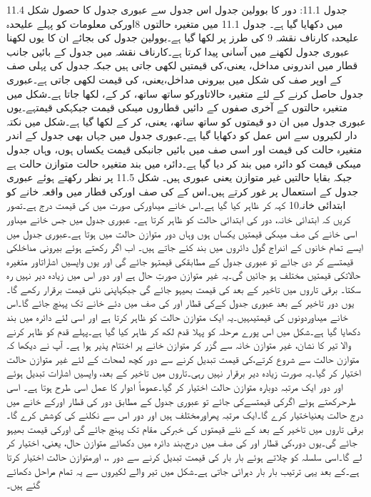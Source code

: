 جدول 11.1: دور کا بوولین جدول
اس جدول سے عبوری جدول کا حصول شکل 11.4 میں دکھایا گیا ہے۔
	جدول 11.1 میں متغیرہ حالتوں 8اورکی معلومات کو پہلے علیحدہ علیحدہ کارناف نقشہ 9 کی طرز پر لکھا گیا ہے۔بوولین جدول کی بجائے ان کا یوں لکھنا عبوری جدول لکھنے میں آسانی پیدا کرتا ہے۔کارناف نقشہ میں جدول کے بائیں جانب قطار میں اندرونی مداخل، یعنی،کی قیمتیں لکھی جاتی ہیں جبکہ جدول کی پہلی صف کے اوپر صف کی شکل میں بیرونی مداخل،یعنی، کی قیمت لکھی جاتی ہے۔عبوری جدول حاصل کرنے کے لئے متغیرہ حالاتاورکو ساتھ ساتھ، کر کے، لکھا جاتا ہے۔شکل میں متغیرہ حالتوں کے آخری صفوں کے دائیں قطاروں میںکی قیمت جبکہکی قیمتہے۔یوں عبوری جدول میں ان دو قیمتوں کو ساتھ ساتھ، یعنی، کر کے لکھا گیا ہے۔شکل میں نکتہ دار لکیروں سے اس عمل کو دکھایا گیا ہے۔عبوری جدول میں جہاں بھی جدول کے اندر متغیرہ حالت کی قیمت اور اسی صف میں بائیں جانبکی قیمت یکساں ہوں، وہاں جدول میںکی قیمت کو دائرہ میں بند کر دیا گیا ہے۔دائرہ میں بند متغیرہ حالت متوازن حالت ہے جبکہ بقایا حالتیں غیر متوازن یعنی عبوری ہیں۔
	شکل 11.5 پر نظر رکھتے ہوئے عبوری جدول کے استعمال پر غور کرتے ہیں۔اس کے کی صف اورکی قطار میں واقعہ خانے کو ابتدائی خانہ10 کہہ کر ظاہر کیا گیا ہے۔اس خانے میںاورکی صورت میں کی قیمت  درج ہے۔تصور کریں کہ ابتدائی خانہ، دور کی ابتدائی حالت کو ظاہر کرتا ہے۔
	عبوری جدول میں جس خانے میںاور اسی خانے کی صف میںکی قیمتیں یکساں ہوں وہاں دور متوازن حالت میں ہوتا ہے۔عبوری جدول میں ایسے تمام خانوں کے اندراج گول دائروں میں بند کئے جاتے ہیں۔ 
	اب اگر رکھتے ہوئے بیرونی مداخلکی قیمتسے  کر دی جائے تو عبوری جدول کے مطابقکی قیمتہو جائے گی اور یوں واپسیں اشاراتاور متغیرہ حالاتکی قیمتیں مختلف ہو جائیں گی۔یہ غیر متوازن صورتِ حال ہے اور دور اس میں زیادہ دیر نہیں رہ سکتا۔ برقی تاروں میں تاخیر کے بعد کی قیمت بھیہو جائے گی جبکہاپنی نئی قیمت برقرار رکھے گا۔یوں دور تاخیر کے بعد عبوری جدول کےکی قطار اور کی صف میں دئے خانے تک پہنچ جائے گا۔اس خانے میںاوردونوں کی قیمتیںہیں۔یہ ایک متوازن حالت کو ظاہر کرتا ہے اور اسی لئے دائرہ میں بند دکھایا گیا ہے۔شکل میں اس پورے مرحلہ کو پہلا قدم لکھ کر ظاہر کیا گیا ہے۔پہلے قدم کو ظاہر کرنے والا تیر کا نشان، غیر متوازن خانہ سے گزر کر متوازن خانے پر اختتام پذیر ہوا ہے۔
	آپ نے دیکھا کہ متوازن حالت سے شروع کرتے،کی قیمت تبدیل کرنے سے دور کچھ لمحات کے لئے غیر متوازن حالت اختیار کر گیا۔یہ صورت زیادہ دیر برقرار نہیں رہی۔تاروں میں تاخیر کے بعد، واپسیں اشارات تبدیل ہوئے اور دور ایک مرتبہ دوبارہ متوازن حالت اختیار کر گیا۔عموماً ادوار کا عمل اسی طرح ہوتا ہے۔
	اسی طرحرکھتے ہوئے  اگرکی قیمتسےکی جائے تو عبوری جدول کے مطابق دور کی قطار اورکے خانے میں درج حالت یعنیاختیار کرے گا۔ایک مرتبہ پھراورمختلف ہیں اور دور اس سے نکلنے کی کوشش کرے گا۔برقی تاروں میں تاخیر کے بعد کے نئے قیمتوں کی خبرکی مقام تک پہنچ جائے گی اورکی قیمت بھیہو جائے گی۔یوں دور،کی قطار اور کی صف میں درج،بند دائرہ میں دکھائے متوازن حال، یعنی، اختیار کر لے گا۔اسی سلسلہ کو چلاتے ہوئے بار بار کی قیمت تبدیل کرنے سے دور ،،  اورمتوازن حالت اختیار کرتا ہے۔کے بعد یہی ترتیب بار بار دہرائی جاتی ہے۔شکل میں تیر والے لکیروں سے یہ تمام مراحل دکھائے گئے ہیں۔
